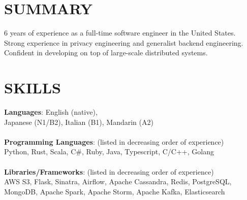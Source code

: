 \documentclass[line,margin]{res}
\begin{document}

\color{HeaderColor}
\address{\hfill riizade@gmail.com}
\address{\hfill linkedin.com/in/riizade -- github.com/riizade -- 1-248-716-5054}


 \renewcommand{\labelitemi}{$-$}

\begin{resume}
\color{black}
\section{\textcolor{HeaderColor}{SUMMARY}}
                6 years of experience as a full-time software engineer in the United States. \\
				Strong experience in privacy engineering and generalist backend engineering. \\
                Confident in developing on top of large-scale distributed systems. \\


\section{\textcolor{HeaderColor}{SKILLS}}
                {\sc \textbf{Languages}: English (native), \\ Japanese (N1/B2), Italian (B1), Mandarin (A2)} \\
                \\
				{\sc \textbf{Programming Languages}: (listed in decreasing order of experience)} \\
				Python, Rust, Scala, C\#, Ruby, Java, Typescript, C/C++, Golang\\
                \\
				{\sc \textbf{Libraries/Frameworks}: (listed in decreasing order of experience)} \\
				AWS S3, Flask, Sinatra, Airflow, Apache Cassandra, Redis, PostgreSQL, MongoDB, Apache Spark, Apache Storm, Apache Kafka, Elasticsearch


\end{resume}
\end{document}
